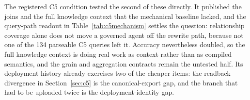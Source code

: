 The registered C5 condition tested the second of these directly. It published the
joins and the full knowledge context that the mechanical baseline lacked, and the
query-path readout in Table~\ref{tab:c5mechanism} settles the question:
relationship coverage alone does not move a governed agent off the rewrite path,
because not one of the 134 parseable C5 queries left it. Accuracy nevertheless
doubled, so the full knowledge context is doing real work as context rather than
as compiled semantics, and the grain and aggregation contracts remain the
untested half. Its deployment
history already exercises two of the cheaper items: the readback divergence in
Section~\ref{sec:c5} is the canonical-export gap, and the branch that had to be
uploaded twice is the deployment-identity gap.
